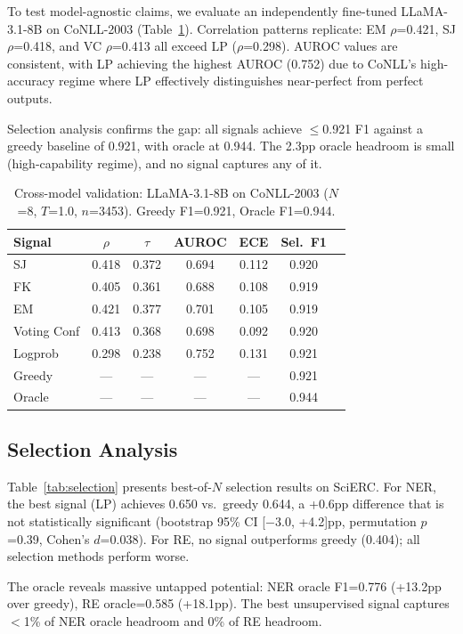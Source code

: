 \documentclass[11pt,a4paper]{article}
\begin{document}
To test model-agnostic claims, we evaluate an independently fine-tuned LLaMA-3.1-8B on CoNLL-2003 (Table~\ref{tab:llama_conll}).
Correlation patterns replicate: EM $\rho$=0.421, SJ $\rho$=0.418, and VC $\rho$=0.413 all exceed LP ($\rho$=0.298).
AUROC values are consistent, with LP achieving the highest AUROC (0.752) due to CoNLL's high-accuracy regime where LP effectively distinguishes near-perfect from perfect outputs.

Selection analysis confirms the gap: all signals achieve $\leq$0.921 F1 against a greedy baseline of 0.921, with oracle at 0.944.
The 2.3pp oracle headroom is small (high-capability regime), and no signal captures any of it.

\begin{table}[t]
\centering
\small
\caption{Cross-model validation: LLaMA-3.1-8B on CoNLL-2003 ($N$=8, $T$=1.0, $n$=3453). Greedy F1=0.921, Oracle F1=0.944.}
\label{tab:llama_conll}
\begin{tabular}{@{}l cccccc@{}}
\toprule
Signal & $\rho$ & $\tau$ & AUROC & ECE & Sel.\ F1 \\
\midrule
SJ & 0.418 & 0.372 & 0.694 & 0.112 & 0.920 \\
FK & 0.405 & 0.361 & 0.688 & 0.108 & 0.919 \\
EM & 0.421 & 0.377 & 0.701 & 0.105 & 0.919 \\
Voting Conf & 0.413 & 0.368 & 0.698 & 0.092 & 0.920 \\
Logprob & 0.298 & 0.238 & 0.752 & 0.131 & 0.921 \\
\midrule
Greedy & --- & --- & --- & --- & 0.921 \\
Oracle & --- & --- & --- & --- & 0.944 \\
\bottomrule
\end{tabular}
\end{table}

\subsection{Selection Analysis}
\label{sec:selection}

Table~\ref{tab:selection} presents best-of-$N$ selection results on SciERC.
For NER, the best signal (LP) achieves 0.650 vs.\ greedy 0.644, a +0.6pp difference that is not statistically significant (bootstrap 95\% CI [$-$3.0, +4.2]pp, permutation $p$=0.39, Cohen's $d$=0.038).
For RE, no signal outperforms greedy (0.404); all selection methods perform worse.

The oracle reveals massive untapped potential: NER oracle F1=0.776 (+13.2pp over greedy), RE oracle=0.585 (+18.1pp).
The best unsupervised signal captures $<$1\% of NER oracle headroom and 0\% of RE headroom.
\end{document}
